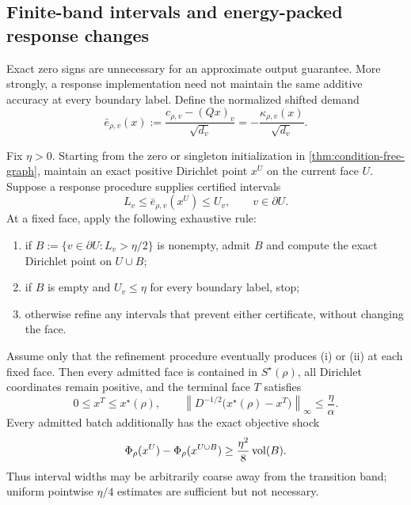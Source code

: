 \subsection{Finite-band intervals and energy-packed response changes}
\label{subsec:finite-band-packing}

Exact zero signs are unnecessary for an approximate output guarantee.  More
strongly, a response implementation need not maintain the same additive
accuracy at every boundary label.  Define the normalized shifted demand
\begin{equation}
 \bar e_{\rho,v}(x)
 :=\frac{c_{\rho,v}-(Qx)_v}{\sqrt{d_v}}
 =-\frac{\kappa_{\rho,v}(x)}{\sqrt{d_v}}.
 \label{eq:normalized-shifted-demand}
\end{equation}

\begin{theorem}
\label{thm:margin-adaptive-finite-gate}
Fix $\eta>0$.  Starting from the zero or singleton initialization in
\cref{thm:condition-free-graph}, maintain an exact positive Dirichlet point
$x^U$ on the current face $U$.  Suppose a response procedure supplies
certified intervals
\begin{equation}
 L_v\leq \bar e_{\rho,v}(x^U)\leq U_v,
 \qquad v\in\partial U.
 \label{eq:adaptive-demand-interval}
\end{equation}
At a fixed face, apply the following exhaustive rule:
\begin{enumerate}[label=(\roman*),leftmargin=*]
 \item if
 $B:=\{v\in\partial U:L_v>\eta/2\}$ is nonempty, admit $B$ and compute the
 exact Dirichlet point on $U\cup B$;
 \item if $B$ is empty and $U_v\leq\eta$ for every boundary label, stop;
 \item otherwise refine any intervals that prevent either certificate,
 without changing the face.
\end{enumerate}
Assume only that the refinement procedure eventually produces (i) or (ii) at
each fixed face.  Then every admitted face is contained in
$S^\star(\rho)$, all Dirichlet coordinates remain positive, and the terminal
face $T$ satisfies
\begin{equation}
 0\leq x^T\leq x^\star(\rho),
 \qquad
 \left\|D^{-1/2}\bigl(x^\star(\rho)-x^T\bigr)\right\|_\infty
 \leq\frac\eta\alpha.
 \label{eq:adaptive-finite-gate-error}
\end{equation}
Every admitted batch additionally has the exact objective shock
\begin{equation}
 \Phi_\rho(x^U)-\Phi_\rho(x^{U\cup B})
 \geq\frac{\eta^2}{8}\operatorname{vol}(B).
 \label{eq:adaptive-finite-gate-shock}
\end{equation}
Thus interval widths may be arbitrarily coarse away from the transition band;
uniform pointwise $\eta/4$ estimates are sufficient but not necessary.
\end{theorem}


